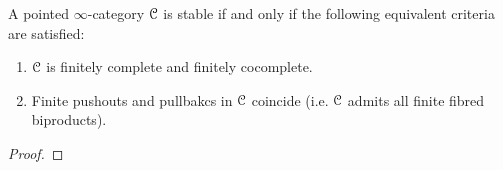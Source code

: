         \begin{proposition} \label{prop: stability_criteria_for_pointed_infinity_categories} 
            A pointed $\infty$-category $\mathcal{C}$ is stable if and only if the following equivalent criteria are satisfied:
                \begin{enumerate}
                    \item $\mathcal{C}$ is finitely complete and finitely cocomplete.
                    \item Finite pushouts and pullbakcs in $\mathcal{C}$ coincide (i.e. $\mathcal{C}$ admits all finite fibred biproducts).
                \end{enumerate}
        \end{proposition}
            \begin{proof}
                

\end{proof}
